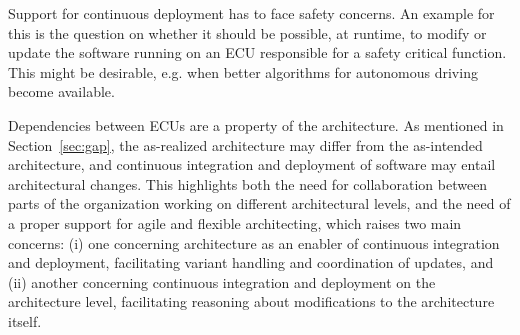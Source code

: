 
Support for continuous deployment has to face safety concerns.
An example for this is the question on whether it should be possible, at runtime,
to modify or update
the software running on an ECU responsible for a safety critical function.
This might be desirable, e.g. when better algorithms for autonomous driving become available.

Dependencies between ECUs are a property of the architecture.
As mentioned in Section~\ref{sec:gap}, the as-realized architecture may differ from the as-intended architecture,
and continuous integration and deployment of software may entail architectural changes.
This highlights both the need for collaboration %
between parts of the organization working on different architectural levels, and the need of a proper support
for agile and flexible architecting, 
%
which raises two main concerns: %
(i) one concerning architecture as an enabler
of continuous integration and deployment,
facilitating variant handling and coordination of updates, and
%
(ii) another concerning continuous integration and deployment
on the architecture level,
facilitating reasoning about modifications to the architecture itself.%


